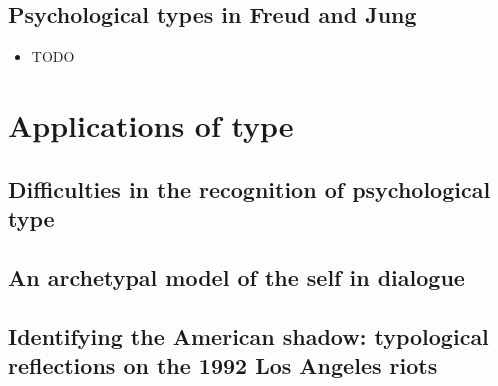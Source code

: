 \subsection{Psychological types in Freud and Jung}

\begin{itemize}

\item TODO

\end{itemize}

\section{Applications of type}

\subsection{Difficulties in the recognition of psychological type}

\subsection{An archetypal model of the self in dialogue}

\subsection{Identifying the American shadow: typological reflections on the 1992 Los Angeles riots}
